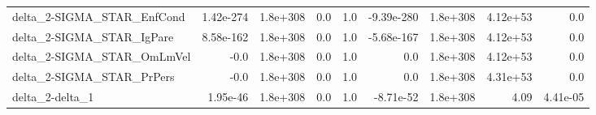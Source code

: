 \begin{tabular}{lrrrrrrrr}
delta\_2-SIGMA\_STAR\_EnfCond            &   1.42e-274 &     1.8e+308 &        0.0 &      1.0 & -9.39e-280 &    1.8e+308 &     4.12e+53 &           0.0 \\
delta\_2-SIGMA\_STAR\_IgPare             &   8.58e-162 &     1.8e+308 &        0.0 &      1.0 & -5.68e-167 &    1.8e+308 &     4.12e+53 &           0.0 \\
delta\_2-SIGMA\_STAR\_OmLmVel            &        -0.0 &     1.8e+308 &        0.0 &      1.0 &        0.0 &    1.8e+308 &     4.12e+53 &           0.0 \\
delta\_2-SIGMA\_STAR\_PrPers             &        -0.0 &     1.8e+308 &        0.0 &      1.0 &        0.0 &    1.8e+308 &     4.31e+53 &           0.0 \\
delta\_2-delta\_1                       &    1.95e-46 &     1.8e+308 &        0.0 &      1.0 &  -8.71e-52 &    1.8e+308 &         4.09 &      4.41e-05 \\
\bottomrule
\end{tabular}
